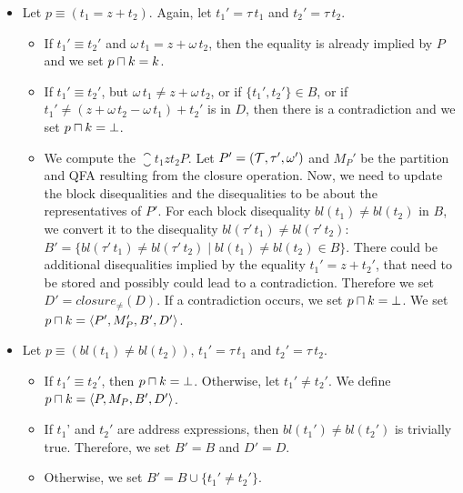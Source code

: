 \begin{itemize}
    \item Let $p \equiv (t_1 = z + t_2)$. Again, let $t_1'=\tau\,t_1$ and $t_2'=\tau\,t_2$.
    \begin{itemize}
        \item If $t_1' \equiv t_2'$ and $\omega\,t_1 = z + \omega\,t_2$,
        then the equality is already implied by $P$ and we set $p \sqcap k = k$.
        \item If $t_1' \equiv t_2'$, but $\omega\,t_1 \neq z + \omega\,t_2$,
        or if $\{t_1',t_2'\}\in B$, or if $t_1' \neq (z + \omega\,t_2 - \omega\,t_1) + t_2'$ is in $D$,
        then there is a contradiction and we set $p \sqcap k = \bot$.
        \item We compute the $\closure{t_1}{z}{t_2}{P}$.
        Let $P' = (\mathcal{T}, \tau', \omega')$ and $M_P'$ be the partition and QFA resulting from the closure operation.
        Now, we need to update the block disequalities and the disequalities to be about the representatives of $P'$.
        For each block disequality $bl(t_1) \neq bl(t_2)$ in $B$, we convert it to the disequality $bl(\tau'\,t_1) \neq bl(\tau'\,t_2)$:
        $B' = \{bl(\tau'\,t_1) \neq bl(\tau'\,t_2) \mid bl(t_1) \neq bl(t_2) \in B\}$.
        There could be additional disequalities implied by the equality $t_1' = z + t_2'$, that need to be stored and
        possibly could lead to a contradiction.
        Therefore we set $D' = closure_\neq(D)$. 
        If a contradiction occurs, we set $p \sqcap k = \bot$.
        We set $p \sqcap k = \langle P',M_P',B',D'\rangle$.
    \end{itemize}
    \item Let $p \equiv (bl(t_1) \neq bl(t_2))$, $t_1'=\tau\,t_1$ and $t_2'=\tau\,t_2$.
    \begin{itemize}
        \item If $t_1' \equiv t_2'$, then $p \sqcap k = \bot$.
         Otherwise, let $t_1' \neq t_2'$. We define $p \sqcap k = \langle P,M_P,B', D'\rangle$.
         \item If $t_1$' and $t_2'$ are address expressions, then $bl(t_1') \neq bl(t_2')$ is trivially true.
          Therefore, we set $B'= B$ and $D'=D$. 
          \item Otherwise, we set $B' = B \cup \{t_1' \neq t_2'\}$.

\end{itemize}
\end{itemize}
